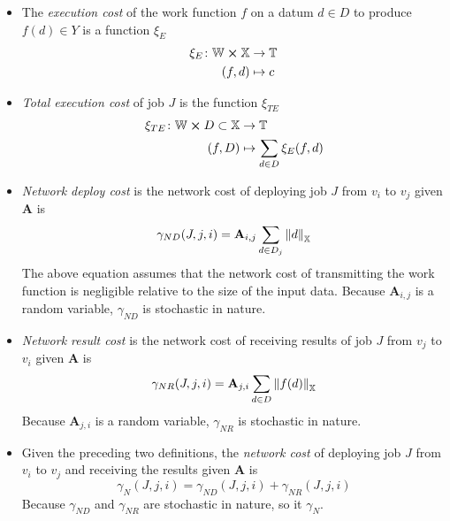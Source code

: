 \documentclass[../mthe-493-project-proposal.tex]{subfiles}
\begin{document}
    \begin{itemize}
        \item The \textit{execution cost} of the work function $f$ on a datum $d \in D$ to      produce $f(d) \in Y$ is a function $\xi_E$
            \begin{align*}
                \xi_E \colon \mathbb{W} \cross \mathbb{X} &\to \mathbb{T} \\
                (f, d) &\mapsto c
            \end{align*}
        
        \item \textit{Total execution cost} of job $J$ is the function $\xi_{TE}$
            \begin{align*}
                \xi_{TE} \colon \mathbb{W} \cross D \subset \mathbb{X} &\to \mathbb{T} \\
                (f, D) &\mapsto \sum\limits_{d \in D} \xi_E(f, d)
            \end{align*}
        
        \item \textit{Network deploy cost} is the network cost of deploying job $J$ from $v_i$ to $v_j$ given $\mathbf{A}$ is
            \begin{equation*}
                \gamma_{ND}(J, j, i) = \mathbf{A}_{i,j} \sum\limits_{d \in D_j} \norm{d}_{\mathbb{X}}
            \end{equation*}
            The above equation assumes that the network cost of transmitting the work function is negligible relative to the size of the input data. Because $\mathbf{A}_{i,j}$ is a random variable, $\gamma_{ND}$ is stochastic in nature.
        
        \item \textit{Network result cost} is the network cost of receiving results of job $J$ from     $v_j$ to $v_i$ given $\mathbf{A}$ is
            \begin{equation*}
                \gamma_{NR}(J, j, i) = \mathbf{A}_{j,i} \sum\limits_{d \in D} \norm{f(d)}_{\mathbb{X}}
            \end{equation*}
            Because $\mathbf{A}_{j,i}$ is a random variable, $\gamma_{NR}$ is stochastic in nature.
            
        \item Given the preceding two definitions, the \textit{network cost} of deploying job $J$ from $v_i$ to $v_j$ and receiving the results  given $\mathbf{A}$ is
            \begin{equation*}
                \gamma_N(J, j, i) = \gamma_{ND}(J, j, i) + \gamma_{NR}(J, j, i)
            \end{equation*}
            Because $\gamma_{ND}$ and $\gamma_{NR}$ are stochastic in nature, so it $\gamma_N$.
    \end{itemize}
    
\end{document}
